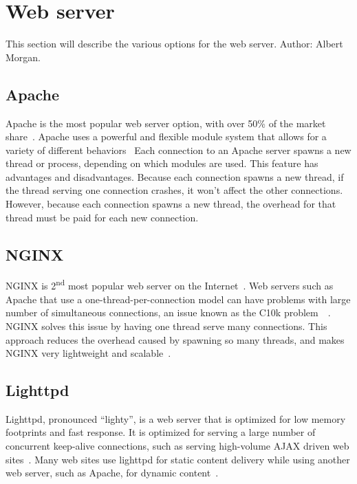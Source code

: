 \documentclass[10pt,draftclsnofoot,onecolumn]{IEEEtran}
\begin{document}
	\section{Web server}
	This section will describe the various options for the web server. Author: Albert Morgan.

	\subsection{Apache}
	Apache is the most popular web server option, with over 50\% of the market share~\cite{apache-usage-statistics}.
	Apache uses a powerful and flexible module system that allows for a variety of different behaviors~\cite{apache-vs-nginx-practical-considerations}
	Each connection to an Apache server spawns a new thread or process, depending on which modules are used.
	This feature has advantages and disadvantages.
	Because each connection spawns a new thread, if the thread serving one connection crashes, it won't affect the other connections.
	However, because each connection spawns a new thread, the overhead for that thread must be paid for each new connection.

	\subsection{NGINX}
	NGINX is 2\textsuperscript{nd} most popular web server on the Internet~\cite{nginx-usage-statistics}.
	Web servers such as Apache that use a one-thread-per-connection model can have problems with large number of simultaneous connections, an issue known as the C10k problem~\cite{apache-vs-nginx-practical-considerations}~\cite{c10k-problem}.
	NGINX solves this issue by having one thread serve many connections.
	This approach reduces the overhead caused by spawning so many threads, and makes NGINX very lightweight and scalable~\cite{nginx-vs-apache-our-view}.
	
	\subsection{Lighttpd}
	Lighttpd, pronounced ``lighty'', is a web server that is optimized for low memory footprints and fast response.
	It is optimized for serving a large number of concurrent keep-alive connections, such as serving high-volume AJAX driven web sites~\cite{lighttpd}. Many web sites use lighttpd for static content delivery while using another web server, such as Apache,
	for dynamic content~\cite{powered-by-lighttpd}.
\end{document}
